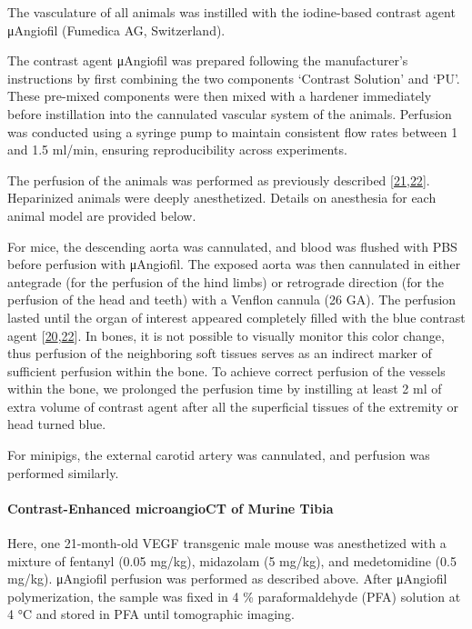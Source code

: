 The vasculature of all animals was instilled with the iodine-based contrast agent μAngiofil (Fumedica AG, Switzerland).

The contrast agent μAngiofil was prepared following the manufacturer's instructions by first combining the two components `Contrast Solution' and `PU'.
These pre-mixed components were then mixed with a hardener immediately before instillation into the cannulated vascular system of the animals.
Perfusion was conducted using a syringe pump to maintain consistent flow rates between 1 and 1.5 ml/min, ensuring reproducibility across experiments.

The perfusion of the animals was performed as previously described {[}\protect\hyperlink{ref-s9aC9H1e}{21},\protect\hyperlink{ref-ijqzbOI6}{22}{]}.
Heparinized animals were deeply anesthetized.
Details on anesthesia for each animal model are provided below.

For mice, the descending aorta was cannulated, and blood was flushed with PBS before perfusion with μAngiofil.
The exposed aorta was then cannulated in either antegrade (for the perfusion of the hind limbs) or retrograde direction (for the perfusion of the head and teeth) with a Venflon cannula (26 GA).
The perfusion lasted until the organ of interest appeared completely filled with the blue contrast agent {[}\protect\hyperlink{ref-TYAmre95}{20},\protect\hyperlink{ref-ijqzbOI6}{22}{]}.
In bones, it is not possible to visually monitor this color change, thus perfusion of the neighboring soft tissues serves as an indirect marker of sufficient perfusion within the bone.
To achieve correct perfusion of the vessels within the bone, we prolonged the perfusion time by instilling at least 2 ml of extra volume of contrast agent after all the superficial tissues of the extremity or head turned blue.

For minipigs, the external carotid artery was cannulated, and perfusion was performed similarly.

\hypertarget{contrast-enhanced-microangioct-of-murine-tibia}{%
\paragraph{Contrast-Enhanced microangioCT of Murine Tibia}\label{contrast-enhanced-microangioct-of-murine-tibia}}

Here, one 21-month-old VEGF transgenic male mouse was anesthetized with a mixture of fentanyl (0.05 mg/kg), midazolam (5 mg/kg), and medetomidine (0.5 mg/kg).
μAngiofil perfusion was performed as described above.
After μAngiofil polymerization, the sample was fixed in 4 \% paraformaldehyde (PFA) solution at 4 °C and stored in PFA until tomographic imaging.

